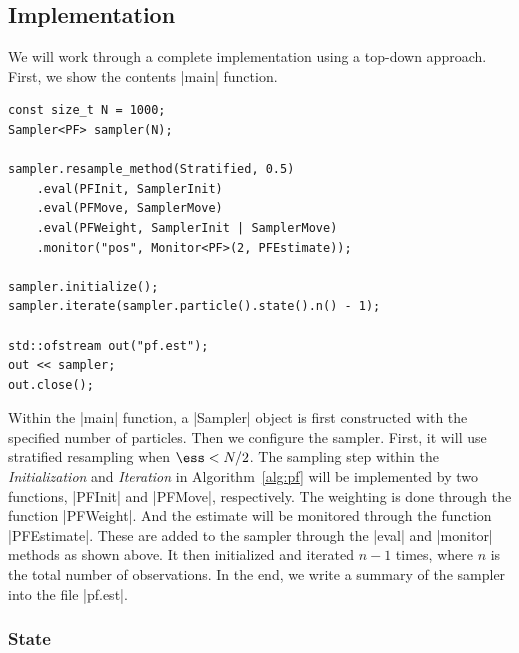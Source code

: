 \subsection{Implementation}
\label{sub:Implementation (PF)}

We will work through a complete implementation using a top-down approach.
First, we show the contents |main| function.
\begin{Verbatim}
const size_t N = 1000;
Sampler<PF> sampler(N);

sampler.resample_method(Stratified, 0.5)
    .eval(PFInit, SamplerInit)
    .eval(PFMove, SamplerMove)
    .eval(PFWeight, SamplerInit | SamplerMove)
    .monitor("pos", Monitor<PF>(2, PFEstimate));

sampler.initialize();
sampler.iterate(sampler.particle().state().n() - 1);

std::ofstream out("pf.est");
out << sampler;
out.close();
\end{Verbatim}
Within the |main| function, a |Sampler| object is first constructed with the
specified number of particles. Then we configure the sampler. First, it will
use stratified resampling when $\ess < N / 2$. The sampling step within the
\emph{Initialization} and \emph{Iteration} in Algorithm~\ref{alg:pf} will be
implemented by two functions, |PFInit| and |PFMove|, respectively. The
weighting is done through the function |PFWeight|. And the estimate will be
monitored through the function |PFEstimate|. These are added to the sampler
through the |eval| and |monitor| methods as shown above. It then initialized
and iterated $n - 1$ times, where $n$ is the total number of observations. In
the end, we write a summary of the sampler into the file |pf.est|.

\subsubsection{State}

